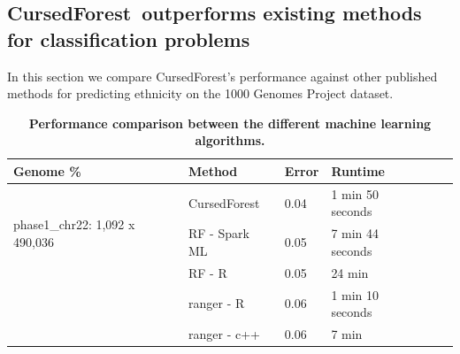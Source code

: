 \documentclass[10pt,letterpaper]{article}
\newcommand{\cursedforest}{{\sc CursedForest}}
\begin{document}
\subsection{\cursedforest\ outperforms existing methods for classification problems}
In this section we compare \cursedforest 's performance against other published methods for predicting ethnicity on the
1000 Genomes Project dataset.

\begin{table}[!ht]
\begin{minipage}{\textwidth}
\centering
\caption{
{\bf Performance comparison between the different machine learning algorithms.}}
\begin{tabular}{|l|l|l|l|l|l||}
\hline
\bf{Genome \%}                      & \bf{Method} & \bf{Error}  & \bf{Runtime}  \\
\hline

\multirow{3}{*}{phase1\_chr22: 1,092 x 490,036} & \cursedforest\ & 0.04  & 1 min 50 seconds                        \\
                                                & RF - Spark ML  &  0.05           &           7 min 44 seconds         \\
                                                & RF - R         & 0.05       & 24 min           \\
                                                & ranger - R      & 0.06       & 1 min 10 seconds       \\
                                                & ranger - c++     & 0.06       & 7 min            \\


\end{tabular}
\end{minipage}
\end{table}
\end{document}
